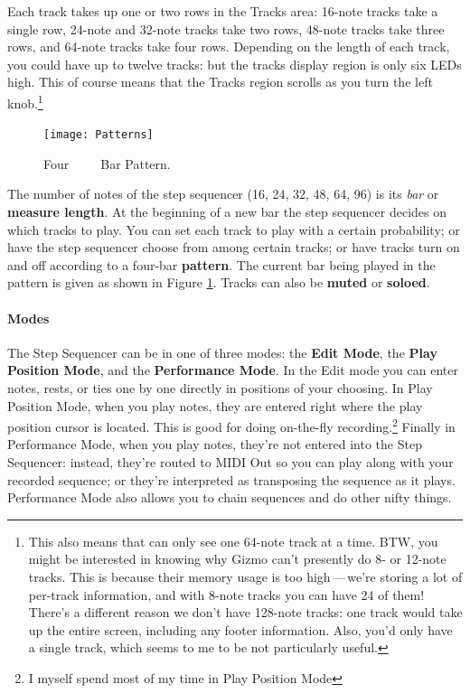 \documentclass{article}
\begin{document}
Each track takes up one or two rows in the Tracks area: 16-note tracks take a single row, 24-note and 32-note tracks take two rows, 48-note tracks take three rows, and 64-note tracks take four rows.    Depending on the length of each track, you could have  up to twelve tracks: but the tracks display region is only six LEDs high.  This of course means that  the Tracks region scrolls as you turn the left knob.\footnote{This also means that can only see one 64-note track at a time.  BTW, you might be interested in knowing why Gizmo can't presently do 8- or 12-note tracks.  This is because their memory usage is too high\,---\,we're storing a lot of per-track information, and with 8-note tracks you can have 24 of them!  There's a different reason we don't have 128-note tracks: one track would take up the entire screen, including any footer information.  Also, you'd only have a single track, which seems to me to be not particularly useful.}

\vspace{10in}

\begin{figure}
\hspace{\fill}\texttt{[image: Patterns]}\hspace{\fill}%
\vspace{-1em}
\caption{\small Four\ \ \ \ \ Bar Pattern.}\vspace{-1em}
\label{bars}
\end{figure}

The number of notes of the step sequencer (16, 24, 32, 48, 64, 96) is its {\it bar} or {\bf measure length}.  At the beginning of a new bar the step sequencer decides on which tracks to play.  You can set each track to play with a certain probability; or have the step sequencer choose from among certain tracks; or have tracks turn on and off according to a four-bar {\bf pattern}.  The current bar being played in the pattern is given as shown in Figure \ref{bars}.  Tracks can also be {\bf muted} or {\bf soloed}.

\paragraph{Modes} The Step Sequencer can be in one of three modes: the {\bf Edit Mode}, the {\bf Play Position Mode}, and the {\bf Performance Mode}.  In the Edit mode you can enter notes, rests, or ties one by one directly in positions of your choosing.  In Play Position Mode, when you play notes, they are entered right where the play position cursor is located.  This is good for doing on-the-fly recording.\footnote{I myself spend most of my time in Play Position Mode}  Finally in Performance Mode, when you play notes, they're not entered into the Step Sequencer: instead, they're routed to MIDI Out so you can play along with your recorded sequence; or they're interpreted as transposing the sequence as it plays.  Performance Mode also allows you to chain sequences and do other nifty things.
\end{document}
